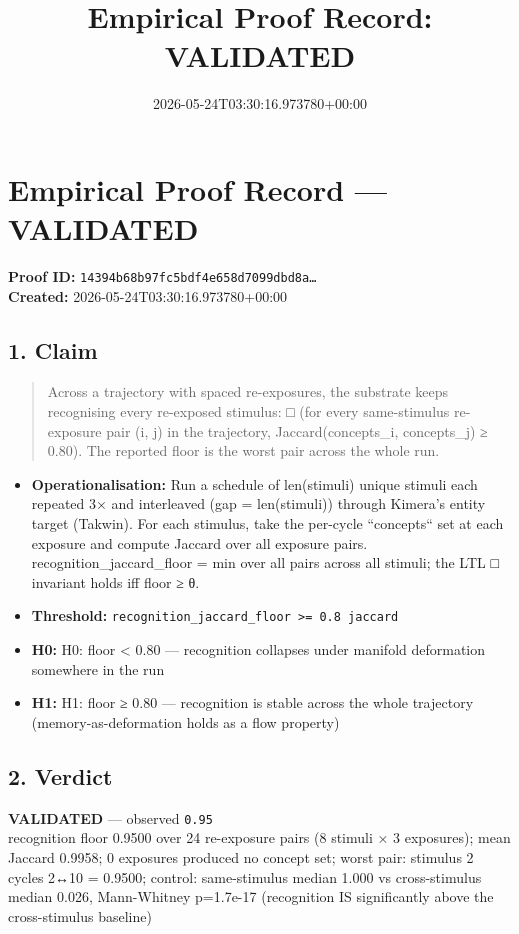 \documentclass{article}
\title{Empirical Proof Record: VALIDATED}
\date{2026-05-24T03:30:16.973780+00:00}
\begin{document}
\maketitle
\section*{Empirical Proof Record --- \textcolor{validated}{\textbf{VALIDATED}}}
\textbf{Proof ID:} \texttt{14394b68b97fc5bdf4e658d7099dbd8a\dots}\\
\textbf{Created:} 2026-05-24T03:30:16.973780+00:00
\subsection*{1. Claim}
\begin{quote}Across a trajectory with spaced re-exposures, the substrate keeps recognising every re-exposed stimulus: □ (for every same-stimulus re-exposure pair (i, j) in the trajectory, Jaccard(concepts\_i, concepts\_j) ≥ 0.80). The reported floor is the worst pair across the whole run.\end{quote}
\begin{itemize}
\item \textbf{Operationalisation:} Run a schedule of len(stimuli) unique stimuli each repeated 3× and interleaved (gap = len(stimuli)) through Kimera's entity target (Takwin). For each stimulus, take the per-cycle ``concepts`` set at each exposure and compute Jaccard over all exposure pairs. recognition\_jaccard\_floor = min over all pairs across all stimuli; the LTL □ invariant holds iff floor ≥ θ.
\item \textbf{Threshold:} \texttt{recognition\_jaccard\_floor >= 0.8 jaccard}
\item \textbf{H0:} H0: floor < 0.80 — recognition collapses under manifold deformation somewhere in the run
\item \textbf{H1:} H1: floor ≥ 0.80 — recognition is stable across the whole trajectory (memory-as-deformation holds as a flow property)
\end{itemize}
\subsection*{2. Verdict}
\textcolor{validated}{\textbf{VALIDATED}} --- observed \texttt{0.95}\\
recognition floor 0.9500 over 24 re-exposure pairs (8 stimuli × 3 exposures); mean Jaccard 0.9958; 0 exposures produced no concept set; worst pair: stimulus 2 cycles 2↔10 = 0.9500; control: same-stimulus median 1.000 vs cross-stimulus median 0.026, Mann-Whitney p=1.7e-17 (recognition IS significantly above the cross-stimulus baseline)
\end{document}
